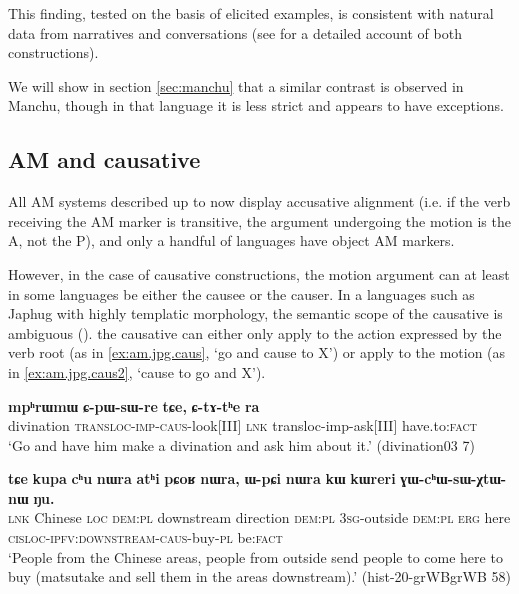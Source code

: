 \documentclass{article}
\newcommand{\ipa}[1]{\textbf{{\phon\mbox{#1}}}} %
\begin{document}
This finding, tested on the basis of elicited examples, is consistent with natural data from narratives and conversations (see \citealt{jacques13harmonization} for a detailed account of both constructions).
  
We will show in section \ref{sec:manchu} that a similar contrast is observed in Manchu, though in that language it is less strict and appears to have exceptions.

  
\subsection{AM and causative} \label{sec:japhug.am.caus}
All AM systems described up to now display accusative alignment (i.e. if the verb receiving the AM marker is transitive, the argument undergoing the motion is the A, not the P), and only a handful of languages have object AM markers. 

However, in the case of causative constructions, the motion argument can at least in some languages be either the causee or the causer. In a languages such as Japhug with highly templatic morphology, the semantic scope of the causative is ambiguous (\citealt[182]{jacques15causative}). the causative can either only apply to the action expressed by the verb root (as in  \ref{ex:am.jpg.caus}, `go and cause to X')  or apply to the motion (as in \ref{ex:am.jpg.caus2}, `cause to go and X').


  \begin{exe}
\ex \label{ex:am.jpg.caus}
\gll
\ipa{mpʰrɯmɯ} 	\ipa{ɕ-pɯ-sɯ-re} 	\ipa{tɕe,} 	\ipa{ɕ-tɤ-tʰe} 	\ipa{ra} \\
divination \textsc{transloc-imp-caus}-look[III] \textsc{lnk} transloc-imp-ask[III] have.to:\textsc{fact} \\
\glt  `Go and have him make a divination and ask him about it.' (divination03 7)
  \end{exe} 

  \begin{exe}
\ex \label{ex:am.jpg.caus2}
\gll
\ipa{tɕe} 	\ipa{kupa} 	\ipa{cʰu} 	\ipa{nɯra} 	\ipa{atʰi} 	\ipa{pɕoʁ} 	\ipa{nɯra,} 	\ipa{ɯ-pɕi} 	\ipa{nɯra} 	\ipa{kɯ} 	\ipa{kɯreri} 	\ipa{ɣɯ-cʰɯ-sɯ-χtɯ-nɯ} 	\ipa{ŋu.}  \\
\textsc{lnk} Chinese \textsc{loc} \textsc{dem:pl} downstream direction \textsc{dem:pl} \textsc{3sg}-outside  \textsc{dem:pl}  \textsc{erg} here \textsc{cisloc-ipfv:downstream-caus}-buy-\textsc{pl} be\textsc{:fact} \\
\glt `People from the Chinese areas, people from outside send people to come here to buy (matsutake and sell them in the areas downstream).' (hist-20-grWBgrWB 58)
  \end{exe} 
  
\end{document}
